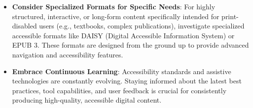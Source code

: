 \begin{itemize}
    \item \textbf{Consider Specialized Formats for Specific Needs}: For highly structured, interactive, or long-form content specifically intended for print-disabled users (e.g., textbooks, complex publications), investigate specialized accessible formats like DAISY (Digital Accessible Information System) or EPUB 3. These formats are designed from the ground up to provide advanced navigation and accessibility features.
    \item \textbf{Embrace Continuous Learning}: Accessibility standards and assistive technologies are constantly evolving. Staying informed about the latest best practices, tool capabilities, and user feedback is crucial for consistently producing high-quality, accessible digital content.
\end{itemize}

